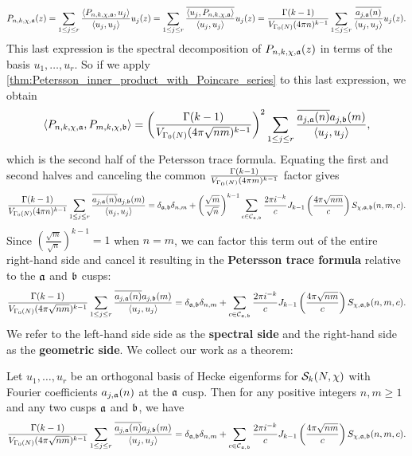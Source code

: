     \[
      P_{n,k,\chi,\mathfrak{a}}(z) = \sum_{1 \le j \le r}\frac{\langle P_{n,k,\chi,\mathfrak{a}},u_{j}\rangle}{\langle u_{j},u_{j}\rangle}u_{j}(z) = \sum_{1 \le j \le r}\frac{\overline{\langle u_{j},P_{n,k,\chi,\mathfrak{a}}\rangle}}{\langle u_{j},u_{j}\rangle}u_{j}(z) = \frac{\Gamma(k-1)}{V_{\Gamma_{0}(N)}(4\pi n)^{k-1}}\sum_{1 \le j \le r}\frac{\overline{a_{j,\mathfrak{a}}(n)}}{\langle u_{j},u_{j}\rangle}u_{j}(z).
    \]
    This last expression is the spectral decomposition of $P_{n,k,\chi,\mathfrak{a}}(z)$ in terms of the basis $u_{1},\ldots,u_{r}$. So if we apply \cref{thm:Petersson_inner_product_with_Poincare_series} to this last expression, we obtain
    \[
      \langle P_{n,k,\chi,\mathfrak{a}},P_{m,k,\chi,\mathfrak{b}}\rangle = \left(\frac{\Gamma(k-1)}{V_{\Gamma_{0}(N)}(4\pi \sqrt{nm})^{k-1}}\right)^{2}\sum_{1 \le j \le r}\frac{\overline{a_{j,\mathfrak{a}}(n)}a_{j,\mathfrak{b}}(m)}{\langle u_{j},u_{j}\rangle},
    \]
    which is the second half of the Petersson trace formula. Equating the first and second halves and canceling the common $\frac{\Gamma(k-1)}{V_{\Gamma_{0}(N)}(4\pi m)^{k-1}}$ factor gives
    \[
      \frac{\Gamma(k-1)}{V_{\Gamma_{0}(N)}(4\pi n)^{k-1}}\sum_{1 \le j \le r}\frac{\overline{a_{j,\mathfrak{a}}(n)}a_{j,\mathfrak{b}}(m)}{\langle u_{j},u_{j}\rangle} = \delta_{\mathfrak{a},\mathfrak{b}}\delta_{n,m}+\left(\frac{\sqrt{m}}{\sqrt{n}}\right)^{k-1}\sum_{c \in \mathcal{C}_{\mathfrak{a},\mathfrak{b}}}\frac{2\pi i^{-k}}{c}J_{k-1}\left(\frac{4\pi\sqrt{nm}}{c}\right)S_{\chi,\mathfrak{a},\mathfrak{b}}(n,m,c).
    \]
    Since $\left(\frac{\sqrt{m}}{\sqrt{n}}\right)^{k-1} = 1$ when $n = m$, we can factor this term out of the entire right-hand side and cancel it resulting in the \textbf{Petersson trace formula} relative to the $\mathfrak{a}$ and $\mathfrak{b}$ cusps:
    \[
      \frac{\Gamma(k-1)}{V_{\Gamma_{0}(N)}(4\pi \sqrt{nm})^{k-1}}\sum_{1 \le j \le r}\frac{\overline{a_{j,\mathfrak{a}}(n)}a_{j,\mathfrak{b}}(m)}{\langle u_{j},u_{j}\rangle} = \delta_{\mathfrak{a},\mathfrak{b}}\delta_{n,m}+\sum_{c \in \mathcal{C}_{\mathfrak{a},\mathfrak{b}}}\frac{2\pi i^{-k}}{c}J_{k-1}\left(\frac{4\pi\sqrt{nm}}{c}\right)S_{\chi,\mathfrak{a},\mathfrak{b}}(n,m,c).
    \]
    We refer to the left-hand side side as the \textbf{spectral side} and the right-hand side as the \textbf{geometric side}. We collect our work as a theorem:

    \begin{theorem*}
      Let $u_{1},\ldots,u_{r}$ be an orthogonal basis of Hecke eigenforms for $\mathcal{S}_{k}(N,\chi)$ with Fourier coefficients $a_{j,
      \mathfrak{a}}(n)$ at the $\mathfrak{a}$ cusp. Then for any positive integers $n,m \ge 1$ and any two cusps $\mathfrak{a}$ and $\mathfrak{b}$, we have
      \[
        \frac{\Gamma(k-1)}{V_{\Gamma_{0}(N)}(4\pi \sqrt{nm})^{k-1}}\sum_{1 \le j \le r}\frac{\overline{a_{j,\mathfrak{a}}(n)}a_{j,\mathfrak{b}}(m)}{\langle u_{j},u_{j}\rangle} = \delta_{\mathfrak{a},\mathfrak{b}}\delta_{n,m}+\sum_{c \in \mathcal{C}_{\mathfrak{a},\mathfrak{b}}}\frac{2\pi i^{-k}}{c}J_{k-1}\left(\frac{4\pi\sqrt{nm}}{c}\right)S_{\chi,\mathfrak{a},\mathfrak{b}}(n,m,c).
      \]
    \end{theorem*}

